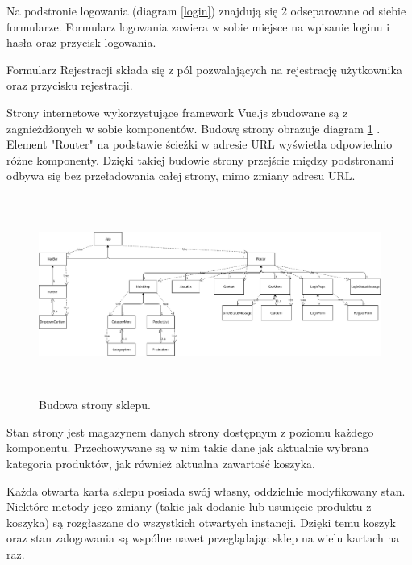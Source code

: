 \documentclass[11pt,a4paper,twoside]{article}
\begin{document}
\begin{enumerate}
Na podstronie logowania (diagram \ref{login}) znajdują się 2 odseparowane od siebie formularze. Formularz logowania zawiera w sobie miejsce na wpisanie loginu i hasła oraz przycisk logowania.

Formularz Rejestracji składa się z pól pozwalających na rejestrację użytkownika oraz przycisku rejestracji.
\end{enumerate}

Strony internetowe wykorzystujące framework Vue.js zbudowane są z zagnieżdżonych w sobie komponentów. Budowę strony obrazuje diagram \ref{frontendUML} . Element "Router" na podstawie ścieżki w adresie URL wyświetla odpowiednio różne komponenty. Dzięki takiej budowie strony przejście między podstronami odbywa się bez przeładowania całej strony, mimo zmiany adresu URL.

\begin{figure}[ht]
\caption{Budowa strony sklepu.}
\label{frontendUML}
\centering
\includegraphics[height=6.5cm, width=15.7cm]{FRONTEND_UML}
\end{figure}

Stan strony jest magazynem danych strony dostępnym z poziomu każdego komponentu. Przechowywane są w nim takie dane jak aktualnie wybrana kategoria produktów, jak również aktualna zawartość koszyka.

Każda otwarta karta sklepu posiada swój własny, oddzielnie modyfikowany stan. Niektóre metody jego zmiany (takie jak dodanie lub usunięcie produktu z koszyka) są rozgłaszane do wszystkich otwartych instancji.  Dzięki temu koszyk oraz stan zalogowania są wspólne nawet przeglądając sklep na wielu kartach na raz.

\end{document}

